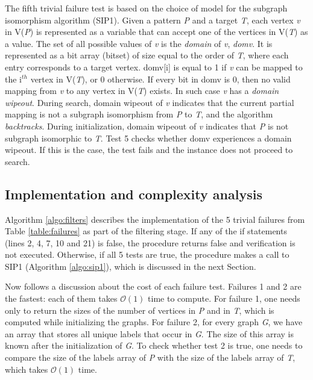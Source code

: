 \documentclass{l4proj}
\begin{document}
The fifth trivial failure test is based on the choice of model for the subgraph isomorphism algorithm (SIP1). Given a pattern \emph{P} and a target \emph{T}, each vertex \emph{v} in V(\emph{P}) is represented as a variable that can accept one of the vertices in V(\emph{T}) as a value. The set of all possible values of \emph{v} is the \emph{domain} of \emph{v}, \emph{domv}. It is represented as a bit array (bitset) of size equal to the order of \emph{T}, where each entry corresponds to a target vertex. domv[i] is equal to 1 if \emph{v} can be mapped to the i$^{th}$ vertex in V(\emph{T}), or 0 otherwise. If every bit in domv is 0, then no valid mapping from \emph{v} to any vertex in V(\emph{T}) exists. In such case \emph{v} has a \emph{domain wipeout}. During search, domain wipeout of \emph{v} indicates that the current partial mapping is not a subgraph isomorphism from \emph{P} to \emph{T}, and the algorithm \emph{backtracks}. During initialization, domain wipeout of \emph{v} indicates that \emph{P} is not subgraph isomorphic to \emph{T}. Test 5 checks whether domv experiences a domain wipeout. If this is the case, the test fails and the instance does not proceed to search.

\subsection{Implementation and complexity analysis}
\label{sec:trivialFailsImplementation}
Algorithm \ref{algo:filters} describes the implementation of the 5 trivial failures from Table \ref{table:failures} as part of the filtering stage. If any of the if statements (lines 2, 4, 7, 10 and 21) is false, the procedure returns false and verification is not executed. Otherwise, if all 5 tests are true, the procedure makes a call to SIP1 (Algorithm \ref{algo:sip1}), which is discussed in the next Section.

Now follows a discussion about the cost of each failure test.
Failures 1 and 2 are the fastest: each of them takes $\mathcal{O}(1)$ time to compute. For failure 1, one needs only to return the sizes of the number of vertices in \emph{P} and in \emph{T}, which is computed while initializing the graphs. For failure 2, for every graph \emph{G}, we have an array that stores all unique labels that occur in \emph{G}. The size of this array is known after the initialization of \emph{G}. To check whether test 2 is true, one needs to compare the size of the labels array of \emph{P} with the size of the labels array of \emph{T},  which takes $\mathcal{O}(1)$ time.
\end{document}
